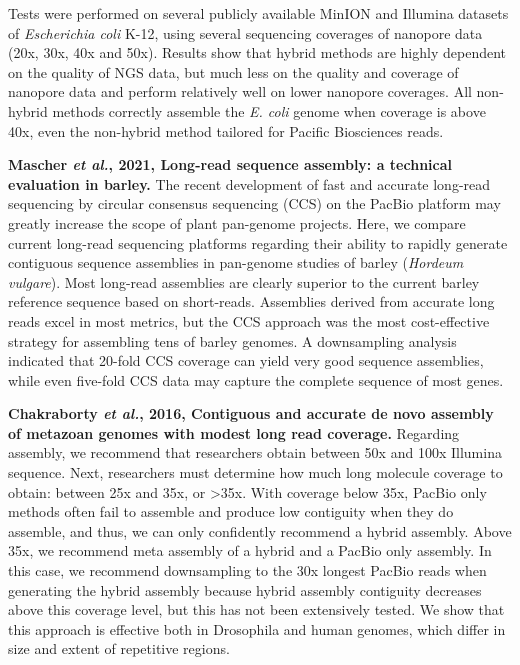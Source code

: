 \documentclass[11pt]{article}
\begin{document}
\begin{sloppypar}
Tests were performed on several publicly available MinION and Illumina datasets of \textit{Escherichia coli} K-12, using several sequencing coverages of nanopore data (20x, 30x, 40x and 50x). 
Results show that hybrid methods are highly dependent on the quality of NGS data, but much less on the quality and coverage of nanopore data and perform relatively well on lower nanopore coverages. 
All non-hybrid methods correctly assemble the \textit{E. coli} genome when coverage is above 40x, even the non-hybrid method tailored for Pacific Biosciences reads. 
\par
\textbf{Mascher \textit{et al.}, 2021, Long-read sequence assembly: a technical evaluation in barley.} \newline
The recent development of fast and accurate long-read sequencing by circular consensus sequencing (CCS) on the PacBio platform may greatly increase the scope of plant pan-genome projects. 
Here, we compare current long-read sequencing platforms regarding their ability to rapidly generate contiguous sequence assemblies in pan-genome studies of barley (\textit{Hordeum vulgare}). 
Most long-read assemblies are clearly superior to the current barley reference sequence based on short-reads. 
Assemblies derived from accurate long reads excel in most metrics, but the CCS approach was the most cost-effective strategy for assembling tens of barley genomes. 
A downsampling analysis indicated that 20-fold CCS coverage can yield very good sequence assemblies, while even five-fold CCS data may capture the complete sequence of most genes. 
\par
\textbf{Chakraborty \textit{et al.}, 2016, Contiguous and accurate de novo assembly of metazoan genomes with modest long read coverage.} \newline
Regarding assembly, we recommend that researchers obtain between 50x and 100x Illumina sequence. 
Next, researchers must determine how much long molecule coverage to obtain: between 25x and 35x, or >35x. 
With coverage below 35x, PacBio only methods often fail to assemble and produce low contiguity when they do assemble, and thus, we can only confidently recommend a hybrid assembly. 
Above 35x, we recommend meta assembly of a hybrid and a PacBio only assembly. 
In this case, we recommend downsampling to the 30x longest PacBio reads when generating the hybrid assembly because hybrid assembly contiguity decreases above this coverage level, but this has not been extensively tested. 
We show that this approach is effective both in Drosophila and human genomes, which differ in size and extent of repetitive regions.

\end{sloppypar}
\end{document}
